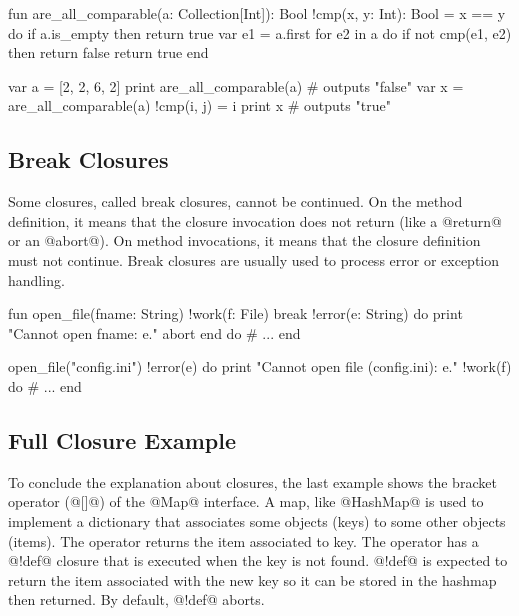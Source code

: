 \begin{lst}
fun are_all_comparable(a: Collection[Int]): Bool
	!cmp(x, y: Int): Bool = x == y
do
	if a.is_empty then return true
	var e1 = a.first
	for e2 in a do if not cmp(e1, e2) then return false
	return true
end

var a = [2, 2, 6, 2]
print are_all_comparable(a) # outputs "false"
var x = are_all_comparable(a) !cmp(i, j) = i%
print x # outputs "true"
\end{lst}

\subsection{Break Closures}\label{break closure}

Some closures, called break closures, cannot be continued.
On the method definition, it means that the closure invocation does not return (like a @return@ or an @abort@).
On method invocations, it means that the closure definition must not continue.
Break closures are usually used to process error or exception handling.


\begin{lst}
fun open_file(fname: String)
	!work(f: File)
	break !error(e: String) do
		print "Cannot open {fname}: {e}."
		abort
	end
do
	# ...
end

open_file("config.ini") !error(e) do
	print "Cannot open file (config.ini): {e}."
!work(f) do
	# ...
end
\end{lst}

\subsection{Full Closure Example}

To conclude the explanation about closures, the last example shows the bracket operator (@[]@) of the @Map@ interface.
A map, like @HashMap@ is used to implement a dictionary that associates some objects (keys) to some other objects (items).
The operator returns the item associated to key.
The operator has a @!def@ closure that is executed when the key is not found.
@!def@ is expected to return the item associated with the new key so it can be stored in the hashmap then returned.
By default, @!def@ aborts.


